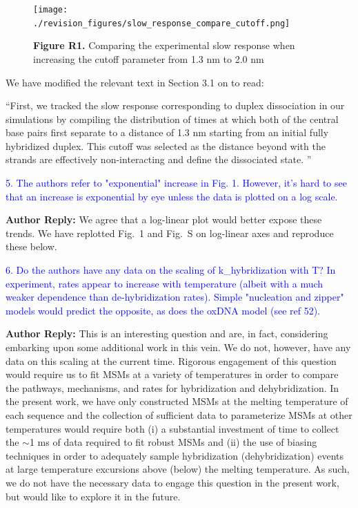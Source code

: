 \documentclass[11pt,a4paper]{letter} %
\newcommand*{\rood}[1]{{\color{red}{#1}}}
\newcommand*{\noter}[1]{{\color{red}{[[#1]]}}}
\begin{document}
\begin{figure}[ht!]
	\begin{center}
        \texttt{[image: ./revision\_figures/slow\_response\_compare\_cutoff.png]}
        \caption*{\textbf{Figure R1.} Comparing the experimental slow response when increasing the cutoff parameter from 1.3 nm to 2.0 nm}
        \label{fig:compare_cutoffs}
	\end{center}
\end{figure}

We have modified the relevant text in Section 3.1 on \rood{p.~15} to read:

``First, we tracked the slow response corresponding to duplex dissociation in our simulations by compiling the distribution of times at which both of the central base pairs first separate to a distance of 1.3 nm starting from an initial fully hybridized duplex. This cutoff was selected as the distance beyond with the strands are effectively non-interacting and define the dissociated state. \rood{We verified that our results were robust to choices of this cutoff over the range 0.8-2.5 nm.}''





\textcolor{blue}{5. The authors refer to "exponential" increase in Fig. 1. However, it's hard to see that an increase is exponential by eye unless the data is plotted on a log scale.}

\textbf{Author Reply:}   We agree that a log-linear plot would better expose these trends. We have replotted Fig.~1 and Fig.~S\rood{4} on log-linear axes and reproduce these below.

\noter{Insert here revised Fig. 1 and Fig. S4 complete with new captions.}





\textcolor{blue}{6. Do the authors have any data on the scaling of k\_hybridization with T? In experiment, rates appear to increase with temperature (albeit with a much weaker dependence than de-hybridization rates). Simple "nucleation and zipper" models would predict the opposite, as does the oxDNA model (see ref 52).}

\textbf{Author Reply:}   This is an interesting question and are, in fact, considering embarking upon some additional work in this vein. We do not, however, have any data on this scaling at the current time. Rigorous engagement of this question would require us to fit MSMs at a variety of temperatures in order to compare the pathways, mechanisms, and rates for hybridization and dehybridization. In the present work, we have only constructed MSMs at the melting temperature of each sequence and the collection of sufficient data to parameterize MSMs at other temperatures would require both (i) a substantial investment of time to collect the $\sim$1 ms of data required to fit robust MSMs and (ii) the use of biasing techniques in order to adequately sample hybridization (dehybridization) events at large temperature excursions above (below) the melting temperature. As such, we do not have the necessary data to engage this question in the present work, but would like to explore it in the future. 
\end{document}
